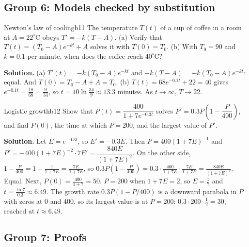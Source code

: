 \documentclass[11pt]{article}
\begin{document}
\subsection*{Group 6: Models checked by substitution}

\begin{exmp}{Newton's law of cooling}{b11}
The temperature $T(t)$ of a cup of coffee in a room at $A=22^\circ$C obeys $T'=-k(T-A)$. (a) Verify that $T(t)=(T_0-A)e^{-kt}+A$ solves it with $T(0)=T_0$. (b) With $T_0=90$ and $k=0.1$ per minute, when does the coffee reach $40^\circ$C?

\textbf{Solution.} (a) $T'(t)=-k(T_0-A)e^{-kt}$ and $-k(T-A)=-k(T_0-A)e^{-kt}$: equal. And $T(0)=T_0-A+A=T_0$. (b) $T(t)=68e^{-0.1t}+22=40$ gives $e^{-0.1t}=\frac{18}{68}=\frac9{34}$, so $t=10\ln\frac{34}9\approx13.3$ minutes. As $t\to\infty$, $T\to22$.
\end{exmp}

\begin{exmp}{Logistic growth}{b12}
Show that $P(t)=\dfrac{400}{1+7e^{-0.3t}}$ solves $P'=0.3P\left(1-\dfrac P{400}\right)$, and find $P(0)$, the time at which $P=200$, and the largest value of $P'$.

\textbf{Solution.} Let $E=e^{-0.3t}$, so $E'=-0.3E$. Then $P=400(1+7E)^{-1}$ and $P'=-400(1+7E)^{-2}\cdot7E'=\dfrac{840E}{(1+7E)^2}$. On the other side, $1-\frac P{400}=1-\frac1{1+7E}=\frac{7E}{1+7E}$, so $0.3P\left(1-\frac P{400}\right)=0.3\cdot\frac{400}{1+7E}\cdot\frac{7E}{1+7E}=\frac{840E}{(1+7E)^2}$. Equal. Next, $P(0)=\frac{400}{1+7}=50$. $P=200$ when $1+7E=2$, so $E=\frac17$ and $t=\frac{\ln7}{0.3}\approx6.49$. The growth rate $0.3P(1-P/400)$ is a downward parabola in $P$ with zeros at $0$ and $400$, so its largest value is at $P=200$: $0.3\cdot200\cdot\frac12=30$, reached at $t\approx6.49$.
\end{exmp}

\subsection*{Group 7: Proofs}
\end{document}
